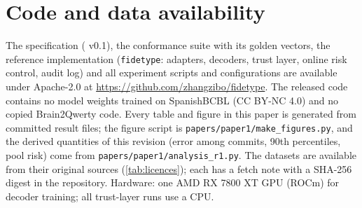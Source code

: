 \section{Code and data availability}
\label{sec:availability}

The specification (\nts{} v0.1), the conformance suite with its golden vectors, the reference implementation (\texttt{fidetype}: adapters, decoders, trust layer, online risk control, audit log) and all experiment scripts and configurations are available under Apache-2.0 at \url{https://github.com/zhangzibo/fidetype}. The released code contains no model weights trained on SpanishBCBL (CC BY-NC 4.0) and no copied Brain2Qwerty code. Every table and figure in this paper is generated from committed result files; the figure script is \texttt{papers/paper1/make\_figures.py}, and the derived quantities of this revision (error among commits, 90th percentiles, pool risk) come from \texttt{papers/paper1/analysis\_r1.py}. The datasets are available from their original sources (\cref{tab:licences}); each has a fetch note with a SHA-256 digest in the repository.  Hardware: one AMD RX 7800 XT GPU (ROCm) for decoder training; all trust-layer runs use a CPU. 

